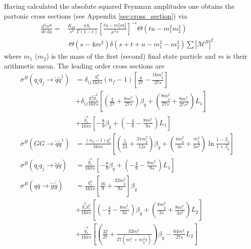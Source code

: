 Having calculated the absolute squared Feynman amplitudes one obtains the partonic cross sections (see Appendix \ref{sec:cross_section}) via
\begin{align}
\frac{\mbox{d}^2 \sigma^B}{\mbox{d}t\ \mbox{d}u} =& \frac{K_{ab}}{s^2} \frac{\pi S_{\epsilon}}{\Gamma(1-\epsilon)} \left[ \frac{tu-m_1^2m_2^2}{\mu^2 s}\right]^{-\epsilon} \Theta(tu-m_1^2m_2^2)\nonumber\\
&\ \Theta(s-4m^2) \delta(s+t+u-m_1^2-m_2^2) \sum |\mathcal{M}^B|^2\label{eq:sigma_tree}
\end{align}
where $m_1$ ($m_2$) is the mass of the first (second) final state particle and $m$ is their arithmetic mean.
The leading order cross sections are
\begin{align}
\sigma^B(q_i \overline{q}_j \to \tilde{q}\tilde{q}^\dagger) &= \delta_{ij}  \frac{g_s^4}{16\pi s} (n_f-1) \left[ \frac{4}{27} - \frac{16 m_{\tilde{q}}^2}{27s} \right]\nonumber\\
&+ \delta_{ij} \frac{g_s^2\hat{g}_s^2}{16\pi s}  \left[ \left( \frac{4}{27} + \frac{8 m_-^2}{27 s} \right)\beta_{\tilde{q}}  + \left( \frac{8m_{\tilde{g}}^2}{27s} + \frac{8m_-^4}{27s^2} \right)L_1 \right]\nonumber\\
& + \frac{\hat{g}_s^4}{16\pi s} \left[ -\frac{8}{9}\beta_{\tilde{q}} + \left( -\frac{4}{9} - \frac{8m_-^2}{9s} \right)L_1 \right]\\
\sigma^B(GG \to \tilde{q}\tilde{q}^\dagger) &= \frac{(n_f-1) g_s^4}{16\pi s} \left[ \left(\frac{5}{24} + \frac{31 m_{\tilde{q}}^2}{12s}\right)\beta_{\tilde{q}} + \left( \frac{4m_{\tilde{q}}^2}{3s} + \frac{m_{\tilde{q}}^4}{3s^2} \right) \ln \frac{1-\beta_{\tilde{q}}}{1+\beta_{\tilde{q}}} \right]\\
\sigma^B(q_i q_j \to \tilde{q}\tilde{q}) &= \frac{\hat{g}_s^4}{16\pi s} \left[ -\frac{8}{9}\beta_{\tilde{q}} +  \left( -\frac{4}{9} - \frac{8m_-^2}{9s} \right)L_1 \right]\\
\sigma^B(q \overline{q} \to \tilde{g}\overline{\tilde{g}}) &= \frac{g_s^4}{16\pi s} \left[ \frac{16}{9} + \frac{32m_{\tilde{g}}^2}{9s} \right] \beta_{\tilde{g}}\nonumber\\
& + \frac{\hat{g}_s^2 g_s^2}{16\pi s}  \left[ \left( -\frac{4}{3}-\frac{8m_-^2}{3s} \right)\beta_{\tilde{g}} + \left( \frac{8 m_{\tilde{g}}^2}{3s} + \frac{8m_-^4}{3s^2} \right) L_2 \right]\nonumber\\
& + \frac{\hat{g}_s^4}{16\pi s} \left[ \left( \frac{32}{27} + \frac{32 m_-^4}{27(m_-^4 + m_{\tilde{q}}^2s)} \right)\beta_{\tilde{g}} - \frac{64m_-^2}{27s}L_2 \right]\label{eq:qqbar_to_sgsgbar}\\

\end{align}
